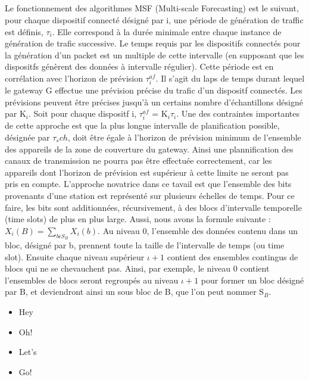 \documentclass[12pt]{article}
\begin{document}
\subparagraph{} Le fonctionnement des algorithmes MSF (Multi-scale Forecasting) est le suivant, pour chaque dispositif connecté désigné par i, une période de génération de traffic est définis, $\tau_i$. Elle correspond à la durée minimale entre chaque instance de génération de trafic successive.
Le temps requis par les dispositifs connectés pour la génération d'un packet est un multiple de cette intervalle (en supposant que les dispositfs génèrent des données à intervalle régulier).
Cette période est en corrélation avec l'horizon de prévision $\tau^{af}_i$.
Il s'agit du laps de temps durant lequel le gateway G effectue une prévision précise du trafic d'un dispositf connectés. Les prévisions peuvent être précises jusqu'à un certains nombre d'échantillons désigné par K$_i$.
Soit pour chaque dispositf i, $\tau^{af}_i$ = K$_i$$\tau_i$.
Une des contraintes importantes de cette approche est que la plus longue intervalle de planification possible, désignée par $\tau_sch$, doit être égale à l'horizon de prévision minimum de l'ensemble des appareils de la zone de couverture du gateway.
Ainsi une plannification des canaux de transmission ne pourra pas être effectuée correctement, car les appareils dont l'horizon de prévision est supérieur à cette limite ne seront pas pris en compte.
L'approche novatrice dans ce tavail est que l'ensemble des bits provenants d'une station est représenté sur plusieurs échelles de temps. Pour ce faire, les bits sont additionnées, récursivement, à des blocs d'intervalle temporelle (time slots) de plus en plus large. 
Aussi, nous avons la formule suivante : $X_{i} (B) = \sum_{b\epsilon S_B} X_{i} (b)$. Au niveau 0, l'ensemble des données contenu dans un bloc, désigné par b, prennent toute la taille de l'intervalle de temps (ou time slot).
Ensuite chaque niveau supérieur $\iota + 1$ contient des ensembles contingus de blocs qui ne se chevauchent pas. Ainsi, par exemple, le niveau 0 contient l'ensembles de blocs seront regroupés au niveau $\iota + 1$ pour former un bloc désigné par B, et deviendront ainsi un sous bloc de B, que l'on peut nommer S$_B$. 





\begin{itemize}

\item Hey

\item Oh!

\item Let’s

\item Go!

\end{itemize}
\end{document}
